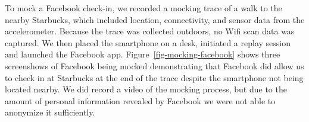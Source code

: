 To mock a Facebook check-in, we recorded a mocking trace of a walk to the
nearby Starbucks, which included location, connectivity, and sensor data from
the accelerometer. Because the trace was collected outdoors, no Wifi scan
data was captured. We then placed the smartphone on a desk, initiated a
replay session and launched the Facebook app.
Figure~\ref{fig-mocking-facebook} shows three screenshows of Facebook being
mocked demonstrating that Facebook did allow us to check in at Starbucks at
the end of the trace despite the smartphone not being located nearby. We did
record a video of the mocking process, but due to the amount of personal
information revealed by Facebook we were not able to anonymize it
sufficiently.

\begin{figure}[t]


\end{figure}
